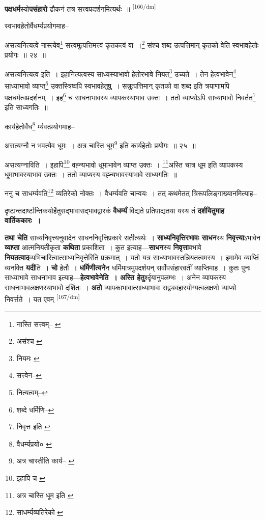 \documentclass[article,12pt,a4paper]{memoir}
\begin{document}
	  \pstart \textbf{पक्षधर्म}स्यो\textbf{पसंहारो} ढौकनं तत्र सत्त्वप्रदर्शनमित्यर्थः ॥
	\pend
      \leavevmode\textsuperscript{\rmlatinfont\tiny [166/dm]}

	  \pstart स्वभावहेतोर्वैधर्म्यप्रयोगमाह--
	\pend
       

	  \pstart असत्यनित्यत्वे नास्त्येव\footnote{नास्ति सत्त्वम्--\cite{dp-msB} \cite{dp-msD} \cite{dp-edP} \cite{dp-edH} \cite{dp-edE} \cite{dp-edN}} सत्त्वमुत्पत्तिमत्त्वं कृतकत्वं वा ।\footnote{असंश्च \cite{dp-msB} \cite{dp-edP} \cite{dp-edH} \cite{dp-edN}} संश्च शब्द उत्पत्तिमान् कृतको वेति स्वभावहेतोः प्रयोगः ॥ २४ ॥
	\pend
       

	  \pstart असत्यनित्यत्व इति । इहानित्यत्वस्य साध्यस्याभावो हेतोरभावे नियत\footnote{नियमः \cite{dp-msB}} उच्यते । तेन हेत्वभावेन\footnote{सत्त्वेन--\cite{dp-msD-n}} साध्याभावो व्याप्त\footnote{नित्यत्वम्--\cite{dp-msD-n}} उक्तस्त्रिष्वपि स्वभावहेतुषु । सन्नुत्पत्तिमान् कृतको वा शब्द इति त्रयाणामपि पक्षधर्मत्वप्रदर्शनम् । इह\footnote{शब्दे धर्मिणि--\cite{dp-msD-n}} च साधनाभावस्य व्यापकस्याभाव उक्तः । ततो व्याप्योऽपि साध्याभावो निवर्तत\footnote{निवृत्त इति \cite{dp-msA} \cite{dp-edP} \cite{dp-edH} \cite{dp-edE} \cite{dp-edN}} इति साध्यगतिः ॥
	\pend
       

	  \pstart कार्यहेतोर्वैध\footnote{वैधर्म्यप्रयो० \cite{dp-msA} \cite{dp-edP} \cite{dp-edH} \cite{dp-edE} \cite{dp-edN}} र्म्यवत्प्रयोगमाह--
	\pend
       

	  \pstart असत्यग्नौ न भवत्येव धूमः । अत्र चास्ति धूम\footnote{अत्र चास्तीति कार्य--\cite{dp-msC} \cite{dp-msD}} इति कार्यहेतोः प्रयोगः ॥ २५ ॥
	\pend
       

	  \pstart असत्यग्नाविति । इहापि\footnote{इहापि च \cite{dp-msC} \cite{dp-msD}} वह्न्यभावो धूमाभावेन व्याप्त उक्तः । \footnote{अत्र चास्ति धूम इति \cite{dp-msC} \cite{dp-msD}}अस्ति चात्र धूम इति व्यापकस्य धूमाभावस्याभाव उक्तः । ततो व्याप्यस्य वह्न्यभावस्याभावे साध्यगतिः ॥
	\pend
       

	  \pstart ननु च साधर्म्यवति\footnote{साधर्म्यव्यतिरेको \cite{dp-msB}} व्यतिरेको नोक्तः । वैधर्म्यवति चान्वयः । तत् कथमेतत् त्रिरूपलिङ्गाख्यानमित्याह--
	\pend
      

	  \pstart दृष्टान्तदार्ष्टान्तिकयोर्हेतुसद्भावासद्भावद्वारकं \textbf{वैधर्म्यं} विद्यते प्रतिपाद्यतया यस्य तं \textbf{दर्शयितुमाह वार्तिककारः ।}
	\pend
      

	  \pstart \textbf{तथा चेति} साध्यनिवृत्त्यनुवादेन साधननिवृत्तिप्रकारे सतीत्यर्थः । \textbf{साध्यनिवृत्तिरभावः साधन}स्य \textbf{निवृत्त्या}ऽभावेन \textbf{व्याप्ता} आत्मनियतीकृता \textbf{कथिता} प्रकाशिता । कुत इत्याह—\textbf{साधन}स्य \textbf{निवृत्ता}वभावे \textbf{नियतत्वाद}व्यभिचारित्वात्साध्यनिवृत्तेरिति प्रक्रमात् । यतो यत्र साध्याभावस्तन्नियतत्वमस्य । इमामेव व्याप्तिं व्यनक्ति \textbf{यदी}ति । \textbf{चो} हेतौ । \textbf{धर्मिणीत्यने}न धर्मिमात्रमुपदर्शयन् सर्वोपसंहारवतीं व्याप्तिमाह । कुतः पुनः साध्याभावे साधनाभाव इत्याह—\textbf{हेत्वभावेनेति । अस्ति हेतु}र्श्दृयानुपलम्भः । अनेन व्यापकस्य साधनाभावलक्षणस्याभावो दर्शितः । \textbf{अतो} व्यापकाभावात्साध्याभावः सद्व्यवहारयोग्यत्वलक्षणो व्याप्यो निवर्त्तते । यत एवम्
	\pend
      \leavevmode\textsuperscript{\rmlatinfont\tiny [167/dm]}
\end{document}

